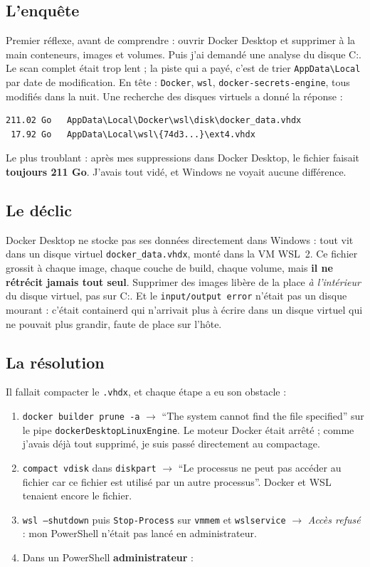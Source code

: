 \documentclass[10pt,twoside,openany]{article}
\begin{document}
\subsection*{L'enquête}
Premier réflexe, avant de comprendre : ouvrir Docker Desktop et supprimer à la main conteneurs, images et volumes. Puis j'ai demandé une analyse du disque C:. Le scan complet était trop lent ; la piste qui a payé, c'est de trier \texttt{AppData\textbackslash Local} par date de modification. En tête : \texttt{Docker}, \texttt{wsl}, \texttt{docker-secrets-engine}, tous modifiés dans la nuit. Une recherche des disques virtuels a donné la réponse :

\begin{lstlisting}
211.02 Go   AppData\Local\Docker\wsl\disk\docker_data.vhdx
 17.92 Go   AppData\Local\wsl\{74d3...}\ext4.vhdx
\end{lstlisting}

Le plus troublant : après mes suppressions dans Docker Desktop, le fichier faisait \textbf{toujours 211 Go}. J'avais tout vidé, et Windows ne voyait aucune différence.

\subsection*{Le déclic}
Docker Desktop ne stocke pas ses données directement dans Windows : tout vit dans un disque virtuel \texttt{docker\_data.vhdx}, monté dans la VM WSL~2. Ce fichier grossit à chaque image, chaque couche de build, chaque volume, mais \textbf{il ne rétrécit jamais tout seul}. Supprimer des images libère de la place \textit{à l'intérieur} du disque virtuel, pas sur C:. Et le \texttt{input/output error} n'était pas un disque mourant : c'était containerd qui n'arrivait plus à écrire dans un disque virtuel qui ne pouvait plus grandir, faute de place sur l'hôte.

\subsection*{La résolution}
Il fallait compacter le \texttt{.vhdx}, et chaque étape a eu son obstacle :

\begin{enumerate}
  \item \texttt{docker builder prune -a} $\rightarrow$ \enquote{The system cannot find the file specified} sur le pipe \texttt{dockerDesktopLinuxEngine}. Le moteur Docker était arrêté ; comme j'avais déjà tout supprimé, je suis passé directement au compactage.
  \item \texttt{compact vdisk} dans \texttt{diskpart} $\rightarrow$ \enquote{Le processus ne peut pas accéder au fichier car ce fichier est utilisé par un autre processus}. Docker et WSL tenaient encore le fichier.
  \item \texttt{wsl --shutdown} puis \texttt{Stop-Process} sur \texttt{vmmem} et \texttt{wslservice} $\rightarrow$ \textit{Accès refusé} : mon PowerShell n'était pas lancé en administrateur.
  \item Dans un PowerShell \textbf{administrateur} :
\end{enumerate}
\end{document}
